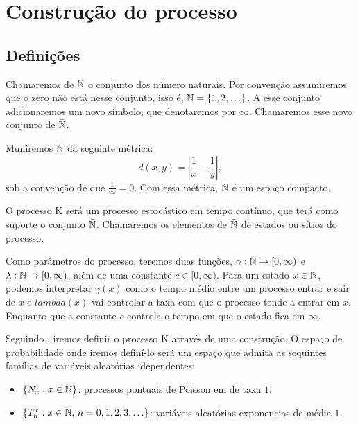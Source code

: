 \chapter{Construção do processo}
\label{cap:construcao}

\section{Definições}
\label{sec:definicoes}

Chamaremos de ${\mathbb{N}}$ o conjunto dos número naturais. Por convenção
assumiremos que o zero não está nesse conjunto, isso é, ${\mathbb{N}} = \{ 1, 2,
\ldots \}$. A esse conjunto adicionaremos um novo símbolo, que
denotaremos por $\infty$. Chamaremos esse novo conjunto de ${\bar{{\mathbb{N}}}}$.

Muniremos ${\bar{{\mathbb{N}}}}$ da seguinte métrica:
\begin{equation}
  \label{eq:metrica}
  d(x, y) = \left\lvert \frac{1}{x} - \frac{1}{y} \right\rvert,
\end{equation}
sob a convenção de que $\frac{1}{\infty} = 0$. Com essa métrica,
${\bar{{\mathbb{N}}}}$ é um espaço compacto. 

O processo K será um processo estocástico em tempo contínuo, que terá
como suporte o conjunto ${\bar{{\mathbb{N}}}}$. Chamaremos os elementos de ${\bar{{\mathbb{N}}}}$ de
estados ou sítios do processo.

Como parâmetros do processo, teremos duas funções,
 $\gamma: {\bar{{\mathbb{N}}}} \to [0, \infty)$ e $\lambda: {\bar{{\mathbb{N}}}} \to [0, \infty)$,
além de uma constante $c \in [0, \infty)$.
Para um estado $x \in {\bar{{\mathbb{N}}}}$, podemos interpretar $\gamma(x)$ como
o tempo médio entre um processo entrar e sair de $x$ e $lambda(x)$
vai controlar a taxa com que o processo tende a entrar em
$x$. Enquanto que a constante $c$ controla o tempo em que o estado
fica em $\infty$.

Seguindo \cite{fontes:08}, iremos definir o processo K através de uma
construção. O espaço de probabilidade onde iremos definí-lo será um
espaço que admita as sequintes famílias de variáveis aleatórias
idependentes:

\begin{itemize}
  \item $\{ N_x: x \in {\mathbb{N}} \}$: processos pontuais de Poisson em de taxa
    $1$.
  \item $\{T_n^x: x \in {\mathbb{N}} , \, n = 0, 1, 2, 3, \ldots \}$:
    variáveis aleatórias exponencias de média $1$.
\end{itemize}

